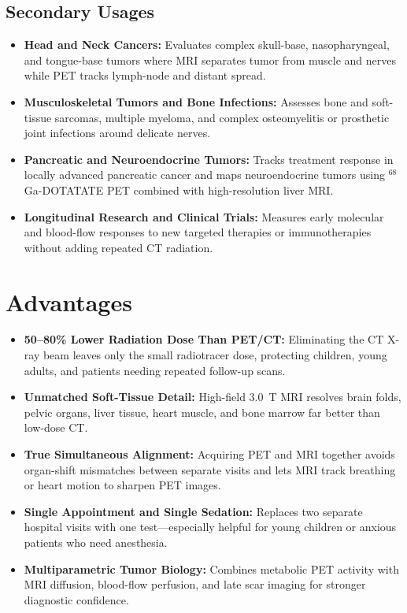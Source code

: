 \subsection{Secondary Usages}
\begin{itemize}
\item \textbf{Head and Neck Cancers:} Evaluates complex skull-base, nasopharyngeal, and tongue-base tumors where MRI separates tumor from muscle and nerves while PET tracks lymph-node and distant spread.
\item \textbf{Musculoskeletal Tumors and Bone Infections:} Assesses bone and soft-tissue sarcomas, multiple myeloma, and complex osteomyelitis or prosthetic joint infections around delicate nerves.
\item \textbf{Pancreatic and Neuroendocrine Tumors:} Tracks treatment response in locally advanced pancreatic cancer and maps neuroendocrine tumors using $^{68}$Ga-DOTATATE PET combined with high-resolution liver MRI.
\item \textbf{Longitudinal Research and Clinical Trials:} Measures early molecular and blood-flow responses to new targeted therapies or immunotherapies without adding repeated CT radiation.
\end{itemize}

\section{Advantages}
\begin{itemize}
\item \textbf{50--80\% Lower Radiation Dose Than PET/CT:} Eliminating the CT X-ray beam leaves only the small radiotracer dose, protecting children, young adults, and patients needing repeated follow-up scans.
\item \textbf{Unmatched Soft-Tissue Detail:} High-field 3.0~T MRI resolves brain folds, pelvic organs, liver tissue, heart muscle, and bone marrow far better than low-dose CT.
\item \textbf{True Simultaneous Alignment:} Acquiring PET and MRI together avoids organ-shift mismatches between separate visits and lets MRI track breathing or heart motion to sharpen PET images.
\item \textbf{Single Appointment and Single Sedation:} Replaces two separate hospital visits with one test---especially helpful for young children or anxious patients who need anesthesia.
\item \textbf{Multiparametric Tumor Biology:} Combines metabolic PET activity with MRI diffusion, blood-flow perfusion, and late scar imaging for stronger diagnostic confidence.
\end{itemize}

